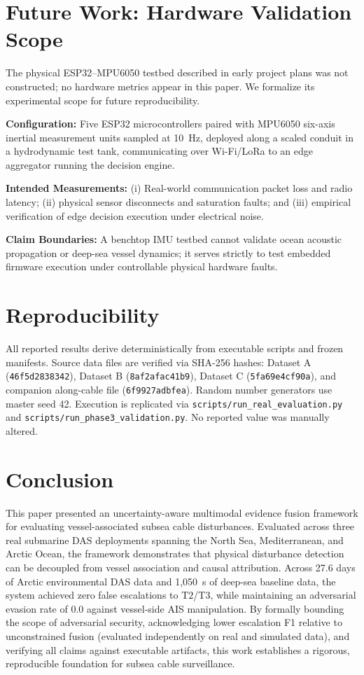 \documentclass[conference]{IEEEtran}
\newcommand{\dstate}[1]{\ensuremath{\mathrm{#1}}}
\begin{document}
\section{Future Work: Hardware Validation Scope}
\label{sec:hardware}

The physical ESP32--MPU6050 testbed described in early project plans was not
constructed; no hardware metrics appear in this paper. We formalize its
experimental scope for future reproducibility.

\textbf{Configuration:} Five ESP32 microcontrollers paired with MPU6050
six-axis inertial measurement units sampled at 10~Hz, deployed along a scaled
conduit in a hydrodynamic test tank, communicating over Wi-Fi/LoRa to an edge
aggregator running the decision engine.

\textbf{Intended Measurements:} (i) Real-world communication packet loss and
radio latency; (ii) physical sensor disconnects and saturation faults; and
(iii) empirical verification of edge decision execution under electrical noise.

\textbf{Claim Boundaries:} A benchtop IMU testbed cannot validate ocean
acoustic propagation or deep-sea vessel dynamics; it serves strictly to test
embedded firmware execution under controllable physical hardware faults.

\section{Reproducibility}

All reported results derive deterministically from executable scripts and frozen
manifests. Source data files are verified via SHA-256 hashes: Dataset A
(\texttt{46f5d2838342}), Dataset B (\texttt{8af2afac41b9}), Dataset C
(\texttt{5fa69e4cf90a}), and companion along-cable file (\texttt{6f9927adbfea}).
Random number generators use master seed 42. Execution is replicated via
\texttt{scripts/run\_real\_evaluation.py} and
\texttt{scripts/run\_phase3\_validation.py}. No reported value was manually altered.

\section{Conclusion}

This paper presented an uncertainty-aware multimodal evidence fusion framework
for evaluating vessel-associated subsea cable disturbances. Evaluated across
three real submarine DAS deployments spanning the North Sea, Mediterranean, and
Arctic Ocean, the framework demonstrates that physical disturbance detection
can be decoupled from vessel association and causal attribution. Across 27.6
days of Arctic environmental DAS data and 1,050~s of deep-sea baseline data,
the system achieved zero false escalations to \dstate{T2}/\dstate{T3}, while
maintaining an adversarial evasion rate of 0.0 against vessel-side AIS
manipulation. By formally bounding the scope of adversarial security,
acknowledging lower escalation F1 relative to unconstrained fusion (evaluated
independently on real and simulated data), and verifying all claims against
executable artifacts, this work establishes a rigorous,
reproducible foundation for subsea cable surveillance.
\end{document}
